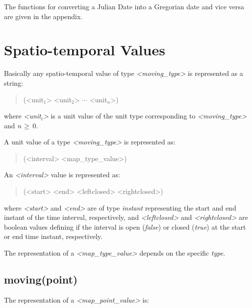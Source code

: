 \documentclass[english,a4paper]{article}
\begin{document}
The functions for converting a Julian Date into a Gregorian date and vice versa are
given in the appendix.

\section{Spatio-temporal Values}

Basically any spatio-temporal value of type \emph{<moving\_type>}
is represented as a string:

\begin{quotation}
(<unit$_{1}$> <unit$_{2}$> $\cdots $ <unit$_{n}$>)
\end{quotation}
where \emph{<unit$_{i}$>} is a unit value of the unit type corresponding
to \emph{<moving\_type>} and \emph{n}$\, \geq \, $0.

A unit value of a type \emph{<moving\_type>} is represented as:

\begin{quotation}
(<interval> <map\_type\_value>)
\end{quotation}

An \emph{<interval>} value is represented as:

\begin{quotation}
(<start> <end> <leftclosed> <rightclosed>)
\end{quotation}
where \emph{<start>} and \emph{<end>} are of type \emph{instant}
representing the start and end instant of the time interval, respectively, and
\emph{<leftclosed>} and \emph{<rightclosed>} are boolean values defining
if the interval is open (\emph{false}) or closed (\emph{true}) at
the start or end time instant, respectively.


\vspace*{3em}
The representation of a \emph{<map\_type\_value>} depends on the specific
\emph{type}.


\subsection{moving(point)}

The representation of a \emph{<map\_point\_value>} is:
\end{document}
